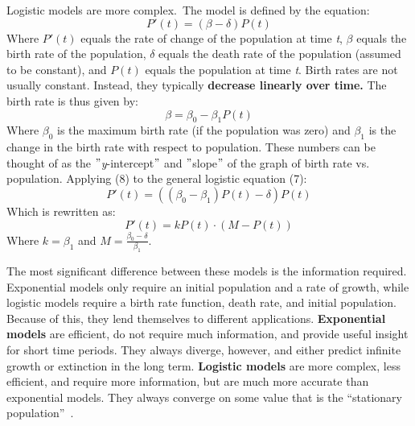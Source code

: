 \documentclass{article}
\begin{document}
    \hspace{\parindent}Logistic models are more complex.\ The model is defined by the equation:
    \begin{equation}
        P'(t)=(\beta - \delta)P(t)\label{eq:equation7}
    \end{equation}
    Where $P'(t)$ equals the rate of change of the population at time \textit{t}, $\beta$ equals the birth rate of the population, $\delta$ equals the death rate of the population (assumed to be constant), and $P(t)$ equals the population at time \textit{t}.
    Birth rates are not usually constant.
    Instead, they typically \textbf{decrease linearly over time.} The birth rate is thus given by:
    \begin{equation}
        \beta = \beta_0 - \beta_{1}P(t)\label{eq:equation8}
    \end{equation}
    Where $\beta_0$ is the maximum birth rate (if the population was zero) and $\beta_1$ is the change in the birth rate with respect to population.
    These numbers can be thought of as the \("\)\textit{y}-intercept\("\) and \("\)slope\("\) of the graph of birth rate vs.
    population.
    Applying (8) to the general logistic equation (7):
    \begin{equation}
        P'(t)=((\beta_0 - \beta_1)P(t) - \delta)P(t)\label{eq:equation9}
    \end{equation}
    Which is rewritten as:
    \begin{equation}
        P'(t)=kP(t) \cdot (M - P(t))\label{eq:equation10}
    \end{equation}
    Where $k=\beta_1$ and $M=\frac{\beta_0 - \delta}{\beta_1}$.

    The most significant difference between these models is the information required.
    Exponential models only require an initial population and a rate of growth, while logistic models require a birth rate function, death rate, and initial population.
    Because of this, they lend themselves to different applications. \textbf{Exponential models} are efficient, do not require much information, and provide useful insight for short time periods.
    They always diverge, however, and either predict infinite growth or extinction in the long term. \textbf{Logistic models} are more complex, less efficient, and require more information, but are much more accurate than exponential models.
    They always converge on some value that is the  ``stationary population''~\cite{hendricks_55_2021}.
\end{document}
